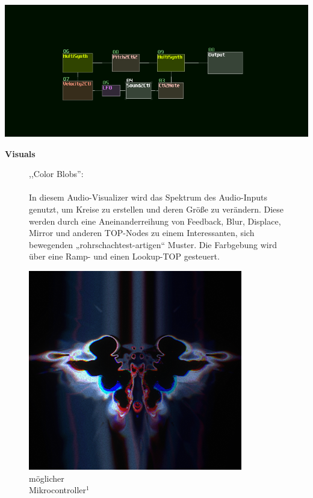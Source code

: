\documentclass[12pt]{scrartcl}%
\theoremstyle{nonumberplain}
\begin{document}
\begin{center}
 \includegraphics[scale=0.9]{sunvox_1}
\end{center}

\newpage

\noindent \textbf{Visuals}
\begin{figure}[h]
   \begin{minipage}[b]{.4\linewidth}
     ,,Color Blobs'':
     \\\\
In diesem Audio-Visualizer wird das Spektrum des Audio-Inputs genutzt, um Kreise zu erstellen und deren Größe zu verändern. Diese werden durch eine Aneinanderreihung von Feedback, Blur, Displace, Mirror und anderen TOP-Nodes zu einem Interessanten, sich bewegenden „rohrschachtest-artigen“ Muster. Die Farbgebung wird über eine Ramp- und einen Lookup-TOP gesteuert.
   \end{minipage}
   \hspace{.1\linewidth}
   \begin{minipage}[b]{.4\linewidth}
      \includegraphics[width=\linewidth]{sunvox_2}
      \caption{möglicher\\Mikrocontroller${}^{1}$}
   \end{minipage}
\end{figure}
\end{document}
